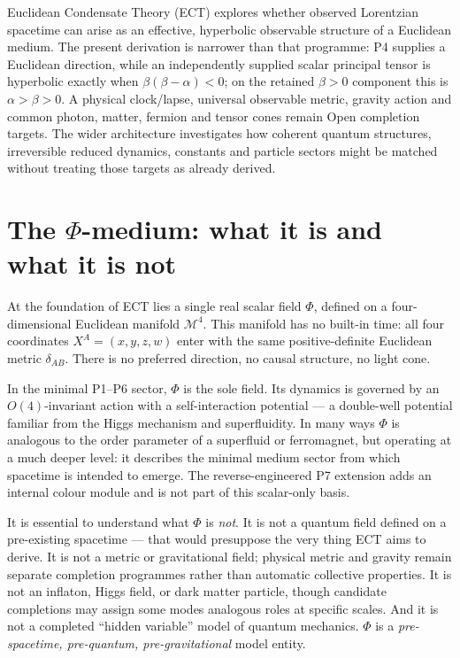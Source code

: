 \documentclass[11pt,a4paper]{article}
\begin{document}
Euclidean Condensate Theory (ECT) explores whether observed Lorentzian spacetime can arise as an effective, hyperbolic observable structure of a Euclidean medium.  The present derivation is narrower than that programme: P4 supplies a Euclidean direction, while an independently supplied scalar principal tensor is hyperbolic exactly when $\beta(\beta-\alpha)<0$; on the retained $\beta>0$ component this is $\alpha>\beta>0$.  A physical clock/lapse, universal observable metric, gravity action and common photon, matter, fermion and tensor cones remain Open completion targets.  The wider architecture investigates how coherent quantum structures, irreversible reduced dynamics, constants and particle sectors might be matched without treating those targets as already derived.


\section{The $\Phi$-medium: what it is and what it is not}
\label{sec:pop_medium}

At the foundation of ECT lies a single real scalar field $\Phi$, defined on a four-dimensional Euclidean manifold $\mathcal{M}^4$. This manifold has no built-in time: all four coordinates $X^A = (x, y, z, w)$ enter with the same positive-definite Euclidean metric $\delta_{AB}$. There is no preferred direction, no causal structure, no light cone.

In the minimal P1--P6 sector, $\Phi$ is the sole field. Its dynamics is governed by an $O(4)$-invariant action with a self-interaction potential --- a double-well potential familiar from the Higgs mechanism and superfluidity. In many ways $\Phi$ is analogous to the order parameter of a superfluid or ferromagnet, but operating at a much deeper level: it describes the minimal medium sector from which spacetime is intended to emerge. The reverse-engineered P7 extension adds an internal colour module and is not part of this scalar-only basis.

It is essential to understand what $\Phi$ is \emph{not}. It is not a quantum field defined on a pre-existing spacetime --- that would presuppose the very thing ECT aims to derive. It is not a metric or gravitational field; physical metric and gravity remain separate completion programmes rather than automatic collective properties. It is not an inflaton, Higgs field, or dark matter particle, though candidate completions may assign some modes analogous roles at specific scales. And it is not a completed ``hidden variable'' model of quantum mechanics. $\Phi$ is a \emph{pre-spacetime, pre-quantum, pre-gravitational} model entity.
\end{document}
